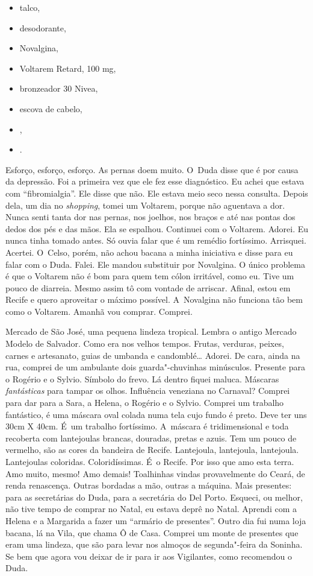 \begin{itemize}
\item
  talco,
\item
  desodorante,
\item
  Novalgina,
\item
  Voltarem Retard, 100 mg,
\item
  bronzeador 30 Nivea,
\item
  escova de cabelo,
\item
  ,
\item
   .
\end{itemize}
Esforço, esforço, esforço. As pernas doem muito. O~Duda disse que é por
causa da depressão. Foi a primeira vez que ele fez esse diagnóstico. Eu
achei que estava com ``fibromialgia''. Ele disse que não. Ele estava
meio seco nessa consulta. Depois dela, um dia no \emph{shopping}, tomei
um Voltarem, porque não aguentava a dor. Nunca senti tanta dor nas
pernas, nos joelhos, nos braços e até nas pontas dos dedos dos pés e das
mãos. Ela se espalhou. Continuei com o Voltarem. Adorei. Eu nunca tinha
tomado antes. Só ouvia falar que é um remédio fortíssimo. Arrisquei.
Acertei. O~Celso, porém, não achou bacana a minha iniciativa e disse
para eu falar com o Duda. Falei. Ele mandou substituir por Novalgina. O
único problema é que o Voltarem não é bom para quem tem cólon irritável,
como eu. Tive um pouco de diarreia. Mesmo assim tô com vontade de
arriscar. Afinal, estou em Recife e quero aproveitar o máximo possível.
A~Novalgina não funciona tão bem como o Voltarem. Amanhã vou comprar.
Comprei.

Mercado de São José, uma pequena lindeza tropical. Lembra o antigo
Mercado Modelo de Salvador. Como era nos velhos tempos. Frutas,
verduras, peixes, carnes e artesanato, guias de umbanda e
candomblé… Adorei. De cara, ainda na rua, comprei de um ambulante
dois guarda"-chuvinhas minúsculos. Presente para o Rogério e o Sylvio.
Símbolo do frevo. Lá dentro fiquei maluca. Máscaras
\emph{fantásticas}\textbf{} para tampar os olhos. Influência veneziana
no Carnaval? Comprei para dar para a Sara, a Helena, o Rogério e o
Sylvio. Comprei um trabalho fantástico, é uma máscara oval colada numa
tela cujo fundo é preto. Deve ter uns 30cm X 40cm. É~um trabalho
fortíssimo. A~máscara é tridimensional e toda recoberta com lantejoulas
brancas, douradas, pretas e azuis. Tem um pouco de vermelho, são as
cores da bandeira de Recife. Lantejoula, lantejoula, lantejoula.
Lantejoulas coloridas. Coloridíssimas. É~o Recife. Por isso que amo esta
terra. Amo muito, mesmo! Amo demais! Toalhinhas vindas provavelmente do
Ceará, de renda renascença. Outras bordadas a mão, outras a máquina.
Mais presentes: para as secretárias do Duda, para a secretária do Del
Porto. Esqueci, ou melhor, não tive tempo de comprar no Natal, eu estava
deprê no Natal. Aprendi com a Helena e a Margarida a fazer um ``armário
de presentes''. Outro dia fui numa loja bacana, lá na Vila, que chama Ô
de Casa. Comprei um monte de presentes que eram uma lindeza, que são
para levar nos almoços de segunda"-feira da Soninha. Se bem que agora vou
deixar de ir para ir aos Vigilantes, como recomendou o Duda.

